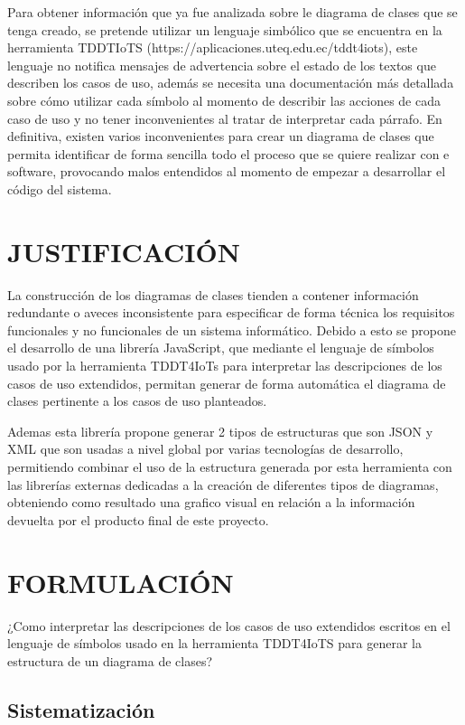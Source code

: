 \documentclass[12pt,a4paper,final]{article}
\begin{document}
	Para obtener información que ya fue analizada sobre le diagrama de clases que se tenga creado, se pretende utilizar un lenguaje simbólico que se encuentra en la herramienta TDDTIoTS (https://aplicaciones.uteq.edu.ec/tddt4iots), este lenguaje no notifica mensajes de advertencia sobre el estado de los textos que describen los casos de uso, además se necesita una documentación más detallada sobre cómo utilizar cada símbolo al momento de describir las acciones de cada caso de uso y no tener inconvenientes al tratar de interpretar cada párrafo. En definitiva, existen varios inconvenientes para crear un diagrama de clases que permita identificar de forma sencilla todo el proceso que se quiere realizar con e software, provocando malos entendidos al momento de empezar a desarrollar el código del sistema.
	
	\section{JUSTIFICACIÓN}
	La construcción de los diagramas de clases tienden a contener información redundante o aveces inconsistente para especificar de forma técnica los requisitos funcionales y no funcionales de un sistema informático. Debido a esto se propone el desarrollo de una librería JavaScript, que mediante el lenguaje de símbolos usado por la herramienta TDDT4IoTs para interpretar las descripciones de los casos de uso extendidos, permitan generar de forma automática el diagrama de clases pertinente a los casos de uso planteados. 
	
	Ademas esta librería propone generar 2 tipos de estructuras que son JSON y XML que son usadas a nivel global por varias tecnologías de desarrollo, permitiendo combinar el uso de la estructura generada por esta herramienta con las librerías externas dedicadas a la creación de diferentes tipos de diagramas, obteniendo como resultado una grafico visual en relación a la información devuelta por el producto final de este proyecto. 
	
	\section{FORMULACIÓN}
	
	¿Como interpretar las descripciones de los casos de uso extendidos escritos en el lenguaje de símbolos usado en la herramienta TDDT4IoTS para generar la estructura de un diagrama de clases?
	
	\subsection{Sistematización}
	
\end{document}

